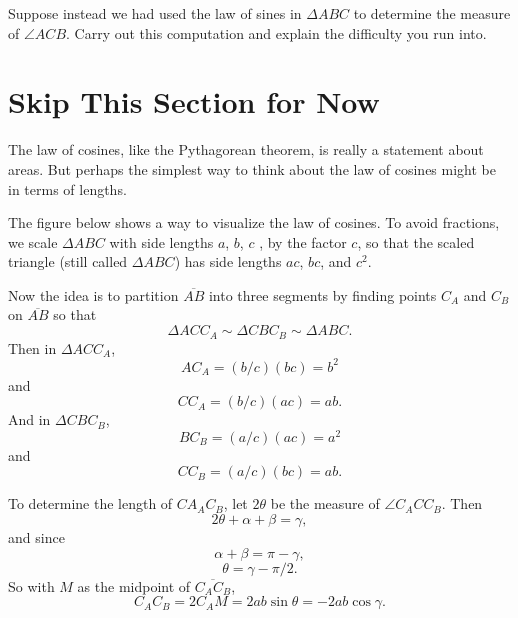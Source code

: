 \documentclass{ximera}
\begin{document}
\begin{example}
\begin{explanation}
\begin{question}  \label{Qertr452}
Suppose instead we had used the law of sines in $\Delta ABC$ to determine the measure of $\angle ACB$. Carry out this computation and explain the difficulty you run into.
\end{question}

\end{explanation}

\end{example}






\section{Skip This Section for Now}

\begin{exploration}
The law of cosines, like the Pythagorean theorem, is really a statement about areas. But perhaps the simplest way to think about the law of cosines might be in terms of lengths. 

The figure below shows a way to visualize the law of cosines. To avoid fractions, we scale $\Delta ABC$ with side lengths $a$, $b$, $c$ , by the factor $c$, so that the scaled triangle (still called $\Delta ABC$) has side lengths $ac$, $bc$, and $c^2$.

 
\begin{onlineOnly}
    \begin{center}
\end{center}
\end{onlineOnly}


Now the idea is to partition $\overline{AB}$ into three segments by finding points $C_A$ and $C_B$ on $\overline{AB}$ so that
\[ 
    \Delta ACC_A \sim \Delta C BC_B \sim \Delta ABC .
\]
Then in $\Delta ACC_A$,
\[
    AC_A = (b/c)(bc) = b^2
\]
and
\[
  CC_A = (b/c)(ac) = ab.
\]
And in $\Delta C BC_B $,
\[
    BC_B = (a/c)(ac) = a^2
\]
and
\[
  CC_B = (a/c)(bc) = ab.
\]

To determine the length of $CA_A C_B$, let $2\theta$ be the measure of $\angle C_A C C_B$. Then
\[
     2\theta + \alpha + \beta = \gamma ,
\]
and since
\[
    \alpha + \beta = \pi - \gamma ,
\]
\[
   \theta = \gamma - \pi/2.
\]
So with $M$ as the midpoint of $\overline{C_A C_B}$,
\[
   C_A C_B = 2 C_A M = 2ab \sin \theta = -2ab\cos\gamma .
\]


\end{exploration}
\end{document}
